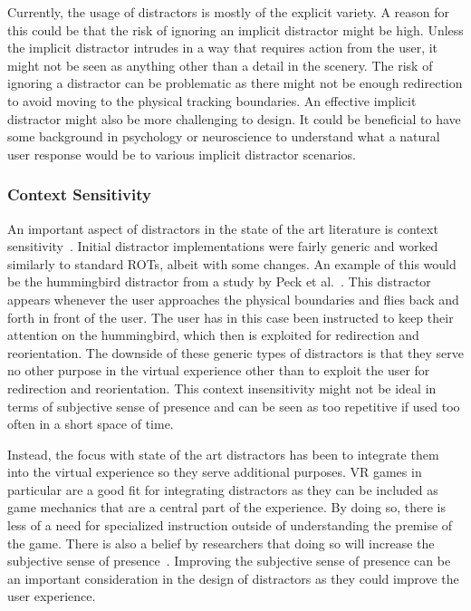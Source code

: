 Currently, the usage of distractors is mostly of the explicit variety. A reason for this could be that the risk of ignoring an implicit distractor might be high. Unless the implicit distractor intrudes in a way that requires action from the user, it might not be seen as anything other than a detail in the scenery. The risk of ignoring a distractor can be problematic as there might not be enough redirection to avoid moving to the physical tracking boundaries. An effective implicit distractor might also be more challenging to design. It could be beneficial to have some background in psychology or neuroscience to understand what a natural user response would be to various implicit distractor scenarios.  

\subsubsection{Context Sensitivity}
An important aspect of distractors in the state of the art literature is context sensitivity~\cite{chen2017towards, chen2017supporting, sra2018vmotion}. Initial distractor implementations were fairly generic and worked similarly to standard ROTs, albeit with some changes. An example of this would be the hummingbird distractor from a study by Peck et al.~\cite{peck2011evaluation}. This distractor appears whenever the user approaches the physical boundaries and flies back and forth in front of the user. The user has in this case been instructed to keep their attention on the hummingbird, which then is exploited for redirection and reorientation. The downside of these generic types of distractors is that they serve no other purpose in the virtual experience other than to exploit the user for redirection and reorientation. This context insensitivity might not be ideal in terms of subjective sense of presence and can be seen as too repetitive if used too often in a short space of time. 

Instead, the focus with state of the art distractors has been to integrate them into the virtual experience so they serve additional purposes. VR games in particular are a good fit for integrating distractors as they can be included as game mechanics that are a central part of the experience. By doing so, there is less of a need for specialized instruction outside of understanding the premise of the game. There is also a belief by researchers that doing so will increase the subjective sense of presence~\cite{chen2017supporting, sra2018vmotion}. Improving the subjective sense of presence can be an important consideration in the design of distractors as they could improve the user experience. 

